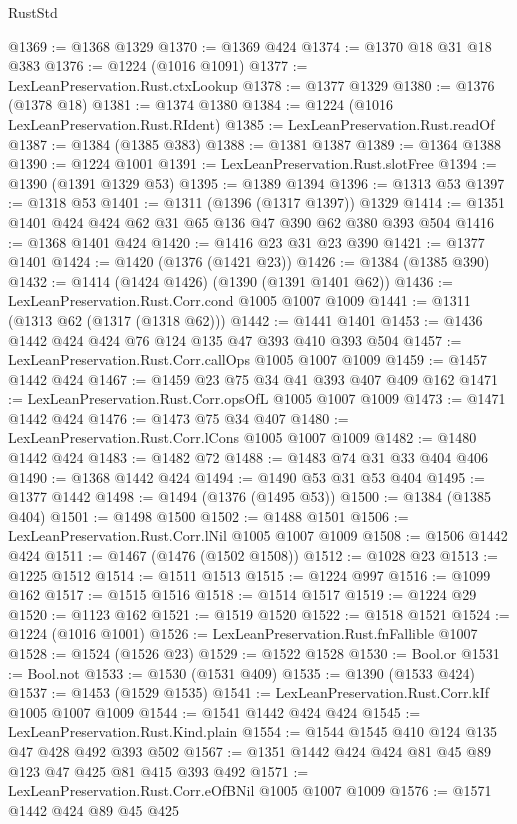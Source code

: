 \begin{lexlean}{RustStd}
\begin{coremodule}
@1369 := @1368 @1329
@1370 := @1369 @424
@1374 := @1370 @18 @31 @18 @383
@1376 := @1224 (@1016 @1091)
@1377 := LexLeanPreservation.Rust.ctxLookup
@1378 := @1377 @1329
@1380 := @1376 (@1378 @18)
@1381 := @1374 @1380
@1384 := @1224 (@1016 LexLeanPreservation.Rust.RIdent)
@1385 := LexLeanPreservation.Rust.readOf
@1387 := @1384 (@1385 @383)
@1388 := @1381 @1387
@1389 := @1364 @1388
@1390 := @1224 @1001
@1391 := LexLeanPreservation.Rust.slotFree
@1394 := @1390 (@1391 @1329 @53)
@1395 := @1389 @1394
@1396 := @1313 @53
@1397 := @1318 @53
@1401 := @1311 (@1396 (@1317 @1397)) @1329
@1414 := @1351 @1401 @424 @424 @62 @31 @65 @136 @47 @390 @62 @380 @393 @504
@1416 := @1368 @1401 @424
@1420 := @1416 @23 @31 @23 @390
@1421 := @1377 @1401
@1424 := @1420 (@1376 (@1421 @23))
@1426 := @1384 (@1385 @390)
@1432 := @1414 (@1424 @1426) (@1390 (@1391 @1401 @62))
@1436 := LexLeanPreservation.Rust.Corr.cond @1005 @1007 @1009
@1441 := @1311 (@1313 @62 (@1317 (@1318 @62)))
@1442 := @1441 @1401
@1453 := @1436 @1442 @424 @424 @76 @124 @135 @47 @393 @410 @393 @504
@1457 := LexLeanPreservation.Rust.Corr.callOps @1005 @1007 @1009
@1459 := @1457 @1442 @424
@1467 := @1459 @23 @75 @34 @41 @393 @407 @409 @162
@1471 := LexLeanPreservation.Rust.Corr.opsOfL @1005 @1007 @1009
@1473 := @1471 @1442 @424
@1476 := @1473 @75 @34 @407
@1480 := LexLeanPreservation.Rust.Corr.lCons @1005 @1007 @1009
@1482 := @1480 @1442 @424
@1483 := @1482 @72
@1488 := @1483 @74 @31 @33 @404 @406
@1490 := @1368 @1442 @424
@1494 := @1490 @53 @31 @53 @404
@1495 := @1377 @1442
@1498 := @1494 (@1376 (@1495 @53))
@1500 := @1384 (@1385 @404)
@1501 := @1498 @1500
@1502 := @1488 @1501
@1506 := LexLeanPreservation.Rust.Corr.lNil @1005 @1007 @1009
@1508 := @1506 @1442 @424
@1511 := @1467 (@1476 (@1502 @1508))
@1512 := @1028 @23
@1513 := @1225 @1512
@1514 := @1511 @1513
@1515 := @1224 @997
@1516 := @1099 @162
@1517 := @1515 @1516
@1518 := @1514 @1517
@1519 := @1224 @29
@1520 := @1123 @162
@1521 := @1519 @1520
@1522 := @1518 @1521
@1524 := @1224 (@1016 @1001)
@1526 := LexLeanPreservation.Rust.fnFallible @1007
@1528 := @1524 (@1526 @23)
@1529 := @1522 @1528
@1530 := Bool.or
@1531 := Bool.not
@1533 := @1530 (@1531 @409)
@1535 := @1390 (@1533 @424)
@1537 := @1453 (@1529 @1535)
@1541 := LexLeanPreservation.Rust.Corr.kIf @1005 @1007 @1009
@1544 := @1541 @1442 @424 @424
@1545 := LexLeanPreservation.Rust.Kind.plain
@1554 := @1544 @1545 @410 @124 @135 @47 @428 @492 @393 @502
@1567 := @1351 @1442 @424 @424 @81 @45 @89 @123 @47 @425 @81 @415 @393 @492
@1571 := LexLeanPreservation.Rust.Corr.eOfBNil @1005 @1007 @1009
@1576 := @1571 @1442 @424 @89 @45 @425

\end{coremodule}
\end{lexlean}
